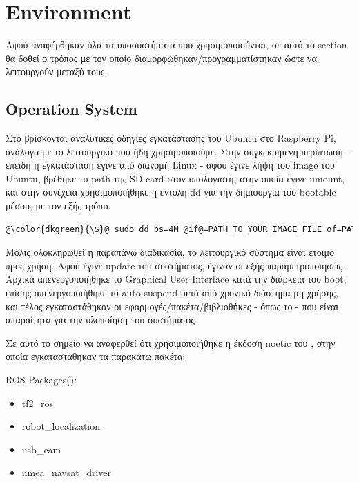 \section{Environment}
Αφού αναφέρθηκαν όλα τα υποσυστήματα που χρησιμοποιούνται, σε αυτό το section θα δοθεί ο τρόπος με τον οποίο διαμορφώθηκαν/προγραμματίστηκαν ώστε να λειτουργούν μεταξύ τους.

\subsection{Operation System} 
Στο \cite{ubuntu-raspi-intall} βρίσκονται αναλυτικές οδηγίες εγκατάστασης του Ubuntu στο Raspberry Pi, ανάλογα με το λειτουργικό που ήδη χρησιμοποιούμε. Στην συγκεκριμένη περίπτωση - επειδή η εγκατάσταση έγινε από διανομή Linux - αφού έγινε λήψη του image του Ubuntu, βρέθηκε το path της SD card στον υπολογιστή, στην οποία έγινε umount, και στην συνέχεια χρησιμοποιήθηκε η εντολή dd για την δημιουργία του bootable μέσου, με τον εξής τρόπο.

\begin{lstlisting}[language=sh, escapechar=@, caption={Create bootable SD from Linux},label=create-bootable-sd-terminal]
    @\color{dkgreen}{\$}@ sudo dd bs=4M @if@=PATH_TO_YOUR_IMAGE_FILE of=PATH_TO_YOUR_SD_CARD status=progress
\end{lstlisting}

Μόλις ολοκληρωθεί η παραπάνω διαδικασία, το λειτουργικό σύστημα είναι έτοιμο προς χρήση. Αφού έγινε update του συστήματος, έγιναν οι εξής παραμετροποιήσεις. Αρχικά απενεργοποιήθηκε το Graphical User Interface κατά την διάρκεια του boot, επίσης απενεργοποιήθηκε το auto-suspend μετά από χρονικό διάστημα μη χρήσης, και τέλος εγκαταστάθηκαν οι εφαρμογές/πακέτα/βιβλιοθήκες - όπως το  - που είναι απαραίτητα για την υλοποίηση του συστήματος. 

Σε αυτό το σημείο να αναφερθεί ότι χρησιμοποιήθηκε η έκδοση noetic του , στην οποία εγκαταστάθηκαν τα παρακάτω πακέτα:

ROS Packages():
\begin{itemize}
  \addtolength{\itemindent}{0.3cm}
  \item tf2\_ros
  \item robot\_localization
  \item usb\_cam
  \item nmea\_navsat\_driver
\end{itemize}


